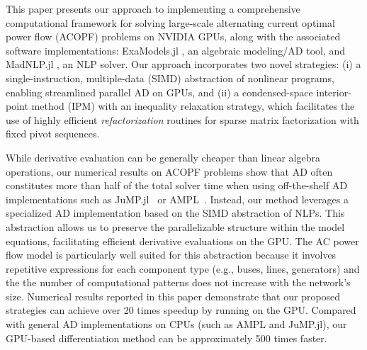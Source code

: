 \documentclass{IEEEtran4PSCC} %
\begin{document}


This paper presents our approach to implementing a comprehensive
computational framework for solving large-scale alternating current optimal power flow (ACOPF) problems on
NVIDIA GPUs, along with the associated software implementations:
ExaModels.jl \cite{simdiff}, an algebraic modeling/AD tool, and MadNLP.jl \cite{madnlp}, an
NLP solver. Our approach incorporates two novel strategies: (i) a
single-instruction, multiple-data (SIMD) abstraction of nonlinear
programs, enabling streamlined parallel AD on GPUs, and (ii) a
condensed-space interior-point method (IPM) with an inequality
relaxation strategy, which facilitates the use of highly efficient
{\it refactorization} routines for sparse matrix factorization with
fixed pivot sequences.


While derivative evaluation can be generally cheaper than linear
algebra operations, our numerical results on ACOPF problems show that
AD often constitutes more than half of the total solver time when
using off-the-shelf AD implementations such as
JuMP.jl~\cite{dunning2017jump} or
AMPL~\cite{fourer1990modeling}. Instead, our method leverages a
specialized AD implementation based on the SIMD abstraction of
NLPs. This abstraction allows us to preserve the parallelizable structure
within the model equations, facilitating efficient derivative
evaluations on the GPU. The AC power flow model is particularly
well suited for this abstraction because it involves repetitive expressions
for each component type (e.g., buses, lines, generators) and the
the number of computational patterns does not increase with the network's
size. Numerical results reported in this paper demonstrate that our
proposed strategies can achieve over 20 times speedup by running on
the GPU. Compared with general AD implementations on CPUs (such as AMPL
and JuMP.jl), our GPU-based differentiation method can be
approximately 500 times faster.
\end{document}
